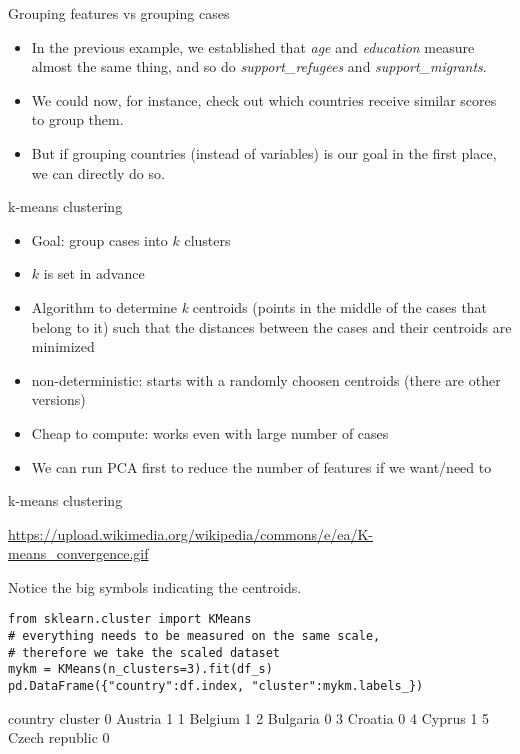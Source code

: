 \begin{frame}{Grouping features vs grouping cases}
  \begin{itemize}[<+->]
  \item  In the previous example, we established that \emph{age} and \emph{education} measure almost the same thing, and so do \emph{support\_refugees} and \emph{support\_migrants}.
  \item We could now, for instance, check out which countries receive similar scores to group them.
  \item But if grouping countries (instead of variables) is our goal in the first place, we can directly do so.
  \end{itemize}
\end{frame}




\begin{frame}{k-means clustering}
\begin{itemize}[<+->]
\item Goal: group cases into $k$ clusters
\item $k$ is set in advance
\item Algorithm to determine \textit{k} centroids (points in the middle of the cases that belong to it) such that the distances between the cases and their centroids are minimized
\item non-deterministic: starts with a randomly choosen centroids (there are other versions)
\item Cheap to compute: works even with large number of cases
\item We can run PCA first to reduce the number of features if we want/need to
\end{itemize}
\end{frame}




\begin{frame}{k-means clustering}

{\tiny{\url{https://upload.wikimedia.org/wikipedia/commons/e/ea/K-means\_convergence.gif}}}

Notice the big symbols indicating the centroids.
\end{frame}


\begin{frame}
\begin{lstlisting}
from sklearn.cluster import KMeans
# everything needs to be measured on the same scale,
# therefore we take the scaled dataset
mykm = KMeans(n_clusters=3).fit(df_s)
pd.DataFrame({"country":df.index, "cluster":mykm.labels_})
\end{lstlisting}

\begin{lstlistingoutputtiny}
           country  cluster
0          Austria        1
1          Belgium        1
2         Bulgaria        0
3          Croatia        0
4           Cyprus        1
5   Czech republic        0
\end{lstlistingoutputtiny}

\end{frame}



